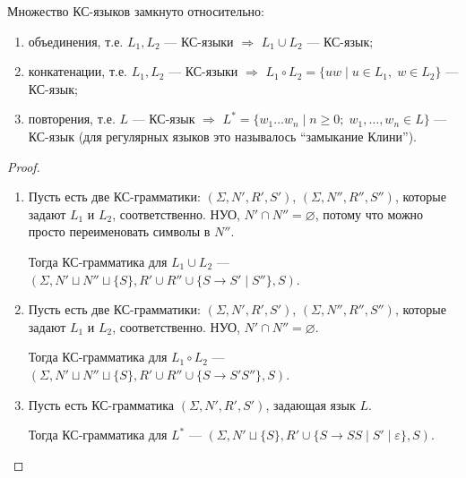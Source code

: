 \begin{theorem}
    Множество КС-языков замкнуто относительно:
    \begin{enumerate}
        \item объединения, т.е. $L_1, L_2$ --- КС-языки $\Rightarrow$ $L_1 \cup L_2$ --- КС-язык;
        \item конкатенации, т.е. $L_1, L_2$ --- КС-языки $\Rightarrow$ $L_1 \circ L_2 = \{ uw \mid u \in L_1, \; w \in L_2 \}$ --- КС-язык;
        \item повторения, т.е. $L$ --- КС-язык $\Rightarrow$ $L^* = \{w_1 \dots w_n \mid n \geqslant 0; \; w_1, \dots, w_n \in L \}$ --- КС-язык (для регулярных языков это называлось ``замыкание Клини'').
    \end{enumerate}
\end{theorem}
\begin{proof} $ $

    \begin{enumerate}
        \item Пусть есть две КС-грамматики: $(\Sigma, N', R', S')$, $(\Sigma, N'', R'', S'')$, которые задают $L_1$ и $L_2$, соответственно. НУО, $N' \cap N'' = \varnothing$, потому что можно просто переименовать символы в $N''$. 
        
        Тогда КС-грамматика для $L_1 \cup L_2$ --- $(\Sigma, N' \sqcup N'' \sqcup \{S\}, R' \cup R'' \cup \{ S \to S' \mid S'' \}, S )$. 

        \item Пусть есть две КС-грамматики: $(\Sigma, N', R', S')$, $(\Sigma, N'', R'', S'')$, которые задают $L_1$ и $L_2$, соответственно. НУО, $N' \cap N'' = \varnothing$. 
        
        Тогда КС-грамматика для $L_1 \circ L_2$ --- $(\Sigma, N' \sqcup N'' \sqcup \{S\}, R' \cup R'' \cup \{ S \to S' S'' \}, S )$. 

        \item Пусть есть КС-грамматика $(\Sigma, N', R', S')$, задающая язык $L$.
        
        Тогда КС-грамматика для $L^*$ --- $(\Sigma, N' \sqcup \{S\}, R' \cup \{ S \to S S \mid S' \mid \varepsilon \}, S )$. 
    \end{enumerate}
\end{proof}

